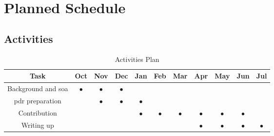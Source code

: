 \chapter{Planned Schedule}

\section{Activities}


\begin{table}[H]
\begin{center}
\begin{tabular}{| c | c | c | c | c | c | c | c | c | c | c |}
\hline
\textbf{Task} & \textbf{Oct} & \textbf{Nov} & \textbf{Dec} & \textbf{Jan} & \textbf{Feb} & \textbf{Mar} & \textbf{Apr} & \textbf{May} & \textbf{Jun} & \textbf{Jul}\\
\hline
Background and \acrshort{soa} & $\bullet$ & $\bullet$ & $\bullet$ & & & & & & & \\
\hline
\acrshort{pdr} preparation & & $\bullet$ & $\bullet$ & $\bullet$ & & & & & & \\
\hline
Contribution & & & &$\bullet$ &$\bullet$ &$\bullet$ &$\bullet$ &$\bullet$ &$\bullet$ & \\
\hline
Writing up & & & & & & & $\bullet$ & $\bullet$ & $\bullet$ & $\bullet$ \\
\hline
\end{tabular}
\end{center}
\caption{Activities Plan}
\end{table}
